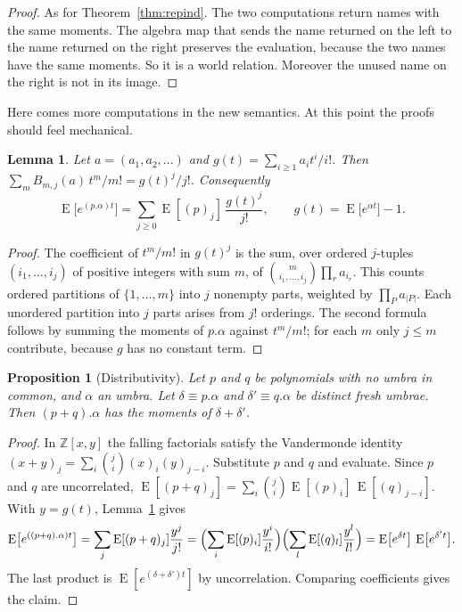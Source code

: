 \documentclass[11pt,a4paper]{report}
\theoremstyle{plain}
\newtheorem{proposition}[theorem]{Proposition}
\newtheorem{lemma}[theorem]{Lemma}
\theoremstyle{definition}
\theoremstyle{remark}
\newcommand{\E}{\operatorname{E}}
\newcommand{\ZZ}{\mathbb{Z}}
\begin{document}
\begin{proof}
As for Theorem~\ref{thm:repind}. The two computations return names with the same
moments. The algebra map that sends the name returned on the left to the name
returned on the right preserves the evaluation, because the two names have the
same moments. So it is a world relation. Moreover the unused name on the right is not in
its image.
\end{proof}

Here comes more computations in the new semantics. At this point the proofs
should feel mechanical.

\begin{lemma}
\label{lem:egf}
Let $a = (a_1, a_2, \dots)$ and $g(t) = \sum_{i \geq 1} a_i t^i / i!$. Then
$\sum_{m} B_{m,j}(a)\, t^m / m! = g(t)^j / j!$. Consequently
\[
  \E\bigl[e^{(p.\alpha) t}\bigr] = \sum_{j \geq 0} \E[(p)_j]\, \frac{g(t)^j}{j!} ,
  \qquad g(t) = \E\bigl[e^{\alpha t}\bigr] - 1 .
\]
\end{lemma}

\begin{proof}
The coefficient of $t^m / m!$ in $g(t)^j$ is the sum, over ordered $j$-tuples
$(i_1, \dots, i_j)$ of positive integers with sum $m$, of
$\binom{m}{i_1, \dots, i_j} \prod_r a_{i_r}$. This counts ordered partitions of
$\{1, \dots, m\}$ into $j$ nonempty parts, weighted by $\prod_P a_{|P|}$. Each
unordered partition into $j$ parts arises from $j!$ orderings. The second
formula follows by summing the moments of $p.\alpha$ against $t^m/m!$; for each
$m$ only $j \leq m$ contribute, because $g$ has no constant term.
\end{proof}

\begin{proposition}[Distributivity]
\label{prop:distributive}
Let $p$ and $q$ be polynomials with no umbra in common, and $\alpha$ an umbra.
Let $\delta \equiv p.\alpha$ and $\delta' \equiv q.\alpha$ be distinct fresh
umbrae. Then $(p + q).\alpha$ has the moments of $\delta + \delta'$.
\end{proposition}

\begin{proof}
In $\ZZ[x, y]$ the falling factorials satisfy the Vandermonde identity
$(x + y)_j = \sum_i \binom{j}{i} (x)_i (y)_{j-i}$. Substitute $p$ and $q$ and
evaluate. Since $p$ and $q$ are uncorrelated,
$\E[(p + q)_j] = \sum_i \binom{j}{i} \E[(p)_i]\, \E[(q)_{j-i}]$. With $y = g(t)$,
Lemma~\ref{lem:egf} gives
\[
  \E\bigl[e^{((p+q).\alpha) t}\bigr]
    = \sum_{j} \E[(p+q)_j] \frac{y^j}{j!}
    = \Bigl(\sum_i \E[(p)_i] \frac{y^i}{i!}\Bigr)\Bigl(\sum_l \E[(q)_l] \frac{y^l}{l!}\Bigr)
    = \E\bigl[e^{\delta t}\bigr]\, \E\bigl[e^{\delta' t}\bigr] .
\]
The last product is $\E[e^{(\delta + \delta') t}]$ by uncorrelation. Comparing
coefficients gives the claim.
\end{proof}
\end{document}
